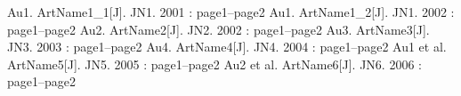 ﻿\documentclass{article}
\renewcommand{\bibsep}{1ex}
\begin{document}
    \begin{thebibliography}{99} 
        \addtolength{\itemsep}{-2ex} 
            Au1. ArtName1\_1[J]. JN1. 2001 : page1--page2
            Au1. ArtName1\_2[J]. JN1. 2002 : page1--page2
            Au2. ArtName2[J]. JN2. 2002 : page1--page2
            Au3. ArtName3[J]. JN3. 2003 : page1--page2
            Au4. ArtName4[J]. JN4. 2004 : page1--page2
            Au1 et al. ArtName5[J]. JN5. 2005 : page1--page2
            Au2 et al. ArtName6[J]. JN6. 2006 : page1--page2
    \end{thebibliography}
\end{document}
